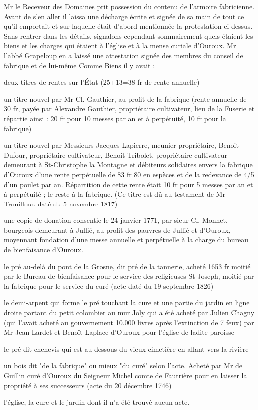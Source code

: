 Mr le Receveur des Domaines prit possession du contenu de l'armoire fabricienne. Avant de s'en aller il laissa une décharge
écrite et signée de sa main de tout ce qu'il emportait et sur laquelle était d'abord mentionnée la protestation ci-dessus.
    Sans rentrer dans les détails, signalons cependant sommairement quels étaient les biens et les charges qui étaient à l'église et à la mense curiale d'Ouroux. Mr l'abbé Grapeloup en a laissé une attestation signée des membres du conseil de fabrique et de lui-même
    Comme Biens il y avait :
\begin{list}{}{\setlength{\leftmargin}{0.06\textwidth}\setlength{\labelwidth}{0.03\textwidth}\setlength{\labelsep}{0.01\textwidth}\setlength{\itemsep}{0.25\baselineskip}\setlength{\parsep}{0pt}}
\item[1/] deux titres de rentes sur l'État (25+13=38 fr de rente annuelle)
\item[2/] un titre nouvel par Mr Cl. Gauthier, au profit de la fabrique (rente annuelle de 30 fr, payée par Alexandre Gauthier, propriétaire cultivateur, lieu de la Fuserie et répartie ainsi : 20 fr pour 10 messes par an et à perpétuité, 10 fr pour la fabrique)
\item[3/] un titre nouvel par Messieurs Jacques Lapierre, meunier propriétaire, Benoit Dufour, propriétaire cultivateur, Benoit Tribolet, propriétaire cultivateur demeurant à St-Christophe la Montagne et débiteurs solidaires envers la fabrique d'Ouroux d'une rente perpétuelle de 83 fr 80 en espèces et de la redevance de 4/5 d'un poulet par an. Répartition de cette rente était 10 fr pour 5 messes par an et à perpétuité ; le reste à la fabrique. (Ce titre est dû au testament de Mr Trouilloux daté du 5 novembre 1817)
\item[4/] une copie de donation consentie le 24 janvier 1771, par sieur Cl. Monnet, bourgeois demeurant à Jullié, au profit des pauvres de Jullié et d'Ouroux, moyennant fondation d'une messe annuelle et perpétuelle à la charge du bureau de bienfaisance d'Ouroux.
\item[5/] le pré au-delà du pont de la Grosne, dit pré de la tannerie, acheté 1653 fr moitié par le Bureau de bienfaisance pour le service des religieuses St Joseph, moitié par la fabrique pour le service du curé (acte daté du 19 septembre 1826)
\item[6/] le demi-arpent qui forme le pré touchant la cure et une partie du jardin en ligne droite partant du petit colombier au mur Joly qui a été acheté par Julien Chagny (qui l'avait acheté au gouvernement 10.000 livres après l'extinction de 7 feux) par Mr Jean Lardet et Benoît Laplace d'Ouroux pour l'église de ladite paroisse
\item[7/] le pré dit chenevis qui est au-dessous du vieux cimetière en allant vers la rivière
\item[8/] un bois dit "de la fabrique" ou mieux "du curé" selon l'acte. Acheté par Mr de Guillin curé d'Ouroux du Seigneur Michel comte de Fautrière pour en laisser la propriété à ses successeurs (acte du 20 décembre 1746)
\item[9/] l'église, la cure et le jardin dont il n'a été trouvé aucun acte.
\end{list}

